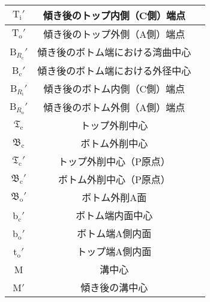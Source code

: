 \begin{longtable}{|c|Sl|}
$\mathrm T_\mathrm i'$ & 傾き後のトップ内側（C側）端点\\\hline
$\mathrm T_\mathrm o'$ & 傾き後のトップ外側（A側）端点\\\hline
B$_{R_\mathrm c}'$ & 傾き後のボトム端における湾曲中心\\\hline
B$_\mathrm c'$ & 傾き後のボトム端における外径中心\\\hline
B$_{R_\mathrm i}'$ & 傾き後のボトム内側（C側）端点\\\hline
B$_{R_\mathrm o}'$ & 傾き後のボトム外側（A側）端点\\\hline
$\mathfrak T_\mathrm c$ & トップ外削中心\\\hline
$\mathfrak B_\mathrm c$ & ボトム外削中心\\\hline
$\mathfrak T_\mathrm c'$ & トップ外削中心（P原点）\\\hline
$\mathfrak B_\mathrm c'$ & ボトム外削中心（P原点）\\\hline
$\mathfrak B_\mathrm o'$ & ボトム外削A面\\\hline
b$_\mathrm c'$ & ボトム端内面中心\\\hline
b$_\mathrm o'$ & ボトム端A側内面\\\hline
t$_\mathrm o'$ & トップ端A側内面\\\hline
M & 溝中心\\\hline
M$'$ & 傾き後の溝中心\\\hline
\end{longtable}

